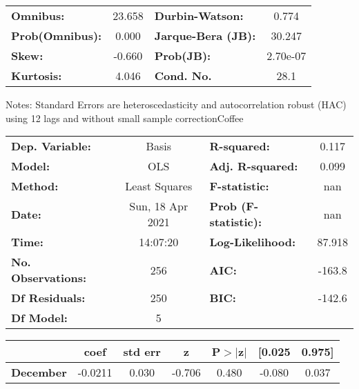 \begin{center}
\begin{tabular}{lcccccc}
\bottomrule
\end{tabular}
\begin{tabular}{lclc}
\textbf{Omnibus:}       & 23.658 & \textbf{  Durbin-Watson:     } &    0.774  \\
\textbf{Prob(Omnibus):} &  0.000 & \textbf{  Jarque-Bera (JB):  } &   30.247  \\
\textbf{Skew:}          & -0.660 & \textbf{  Prob(JB):          } & 2.70e-07  \\
\textbf{Kurtosis:}      &  4.046 & \textbf{  Cond. No.          } &     28.1  \\
\bottomrule
\end{tabular}
\end{center}

Notes: \newline
 [1] Standard Errors are heteroscedasticity and autocorrelation robust (HAC) using 12 lags and without small sample correctionCoffee\begin{center}
\begin{tabular}{lclc}
\toprule
\textbf{Dep. Variable:}    &      Basis       & \textbf{  R-squared:         } &     0.117   \\
\textbf{Model:}            &       OLS        & \textbf{  Adj. R-squared:    } &     0.099   \\
\textbf{Method:}           &  Least Squares   & \textbf{  F-statistic:       } &       nan   \\
\textbf{Date:}             & Sun, 18 Apr 2021 & \textbf{  Prob (F-statistic):} &      nan    \\
\textbf{Time:}             &     14:07:20     & \textbf{  Log-Likelihood:    } &    87.918   \\
\textbf{No. Observations:} &         256      & \textbf{  AIC:               } &    -163.8   \\
\textbf{Df Residuals:}     &         250      & \textbf{  BIC:               } &    -142.6   \\
\textbf{Df Model:}         &           5      & \textbf{                     } &             \\
\bottomrule
\end{tabular}
\begin{tabular}{lcccccc}
                  & \textbf{coef} & \textbf{std err} & \textbf{z} & \textbf{P$> |$z$|$} & \textbf{[0.025} & \textbf{0.975]}  \\
\midrule
\textbf{December} &      -0.0211  &        0.030     &    -0.706  &         0.480        &       -0.080    &        0.037     \\

\end{tabular}
\end{center}
